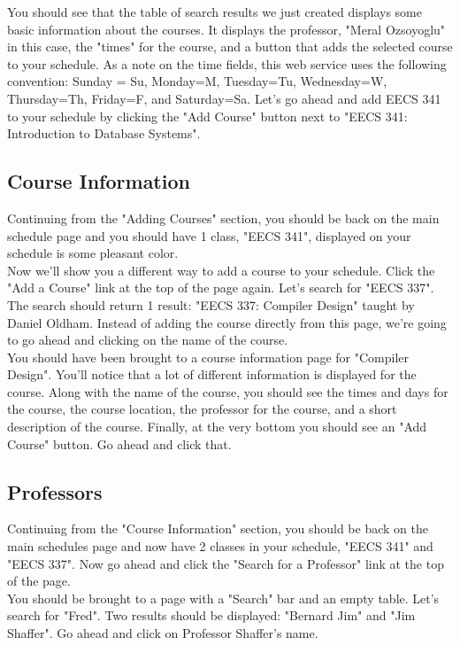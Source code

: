 \documentclass[pdftex,12pt,letter]{article}
\begin{document}
You should see that the table of search results we just created displays some basic information about the courses. It displays the professor, "Meral Ozsoyoglu" in this case, the "times" for the course, and a button that adds the selected course to your schedule. As a note on the time fields, this web service uses the following convention: Sunday = Su, Monday=M, Tuesday=Tu, Wednesday=W, Thursday=Th, Friday=F, and Saturday=Sa. Let's go ahead and add EECS 341 to your schedule by clicking the "Add Course" button next to "EECS 341: Introduction to Database Systems".\\

\subsection{Course Information} 
Continuing from the "Adding Courses" section, you should be back on the main schedule page and you should have 1 class, "EECS 341", displayed on your schedule is some pleasant color.\\

Now we'll show you a different way to add a course to your schedule. Click the "Add a Course" link at the top of the page again. Let's search for "EECS 337". The search should return 1 result: "EECS 337: Compiler Design" taught by Daniel Oldham. Instead of adding the course directly from this page, we're going to go ahead and clicking on the name of the course.\\

You should have been brought to a course information page for "Compiler Design". You'll notice that a lot of different information is displayed for the course. Along with the name of the course, you should see the times and days for the course, the course location, the professor for the course, and a short description of the course. Finally, at the very bottom you should see an "Add Course" button. Go ahead and click that.

\subsection{Professors}
Continuing from the "Course Information" section, you should be back on the main schedules page and now have 2 classes in your schedule, "EECS 341" and "EECS 337". Now go ahead and click the "Search for a Professor" link at the top of the page.\\

You should be brought to a page with a "Search" bar and an empty table. Let's search for "Fred". Two results should be displayed: "Bernard Jim" and "Jim Shaffer". Go ahead and click on Professor Shaffer's name.\\
\end{document}
